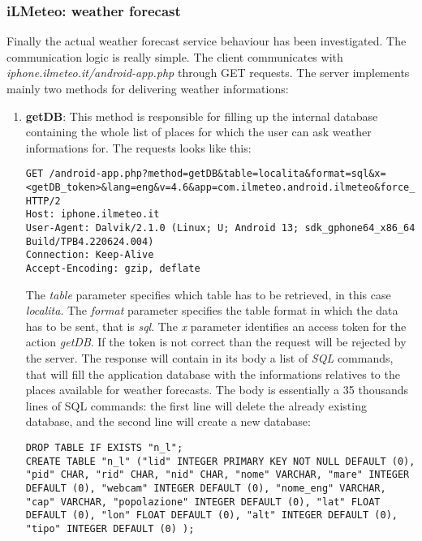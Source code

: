 			\subsubsection{iLMeteo: weather forecast}
				\par Finally the actual weather forecast service behaviour has been investigated. The communication logic is really simple. The client communicates with \textit{iphone.ilmeteo.it/android-app.php} through GET requests. The server implements mainly two methods for delivering weather informations:
				\begin{enumerate}
					\item \textbf{getDB}: This method is responsible for filling up the internal database containing the whole list of places for which the user can ask weather informations for. The requests looks like this:
\begin{lstlisting}
GET /android-app.php?method=getDB&table=localita&format=sql&x=<getDB_token>&lang=eng&v=4.6&app=com.ilmeteo.android.ilmeteo&force_3h=0 HTTP/2
Host: iphone.ilmeteo.it
User-Agent: Dalvik/2.1.0 (Linux; U; Android 13; sdk_gphone64_x86_64 Build/TPB4.220624.004)
Connection: Keep-Alive
Accept-Encoding: gzip, deflate
\end{lstlisting}	
						The \textit{table} parameter specifies which table has to be retrieved, in this case \textit{localita}.\newline
						The \textit{format} parameter specifies the table format in which the data has to be sent, that is \textit{sql}.\newline
						The \textit{x} parameter identifies an access token for the action \textit{getDB}. If the token is not correct than the request will be rejected by the server.\newline
						The response will contain in its body a list of \textit{SQL} commands, that will fill the application database with the informations relatives to the places available for weather forecasts. The body is essentially a 35 thousands lines of SQL commands: the first line will delete the already existing database, and the second line will create a new database:
\begin{lstlisting}
DROP TABLE IF EXISTS "n_l";
CREATE TABLE "n_l" ("lid" INTEGER PRIMARY KEY NOT NULL DEFAULT (0), "pid" CHAR, "rid" CHAR, "nid" CHAR, "nome" VARCHAR, "mare" INTEGER DEFAULT (0), "webcam" INTEGER DEFAULT (0), "nome_eng" VARCHAR, "cap" VARCHAR, "popolazione" INTEGER DEFAULT (0), "lat" FLOAT DEFAULT (0), "lon" FLOAT DEFAULT (0), "alt" INTEGER DEFAULT (0), "tipo" INTEGER DEFAULT (0) );

\end{lstlisting}
\end{enumerate}
